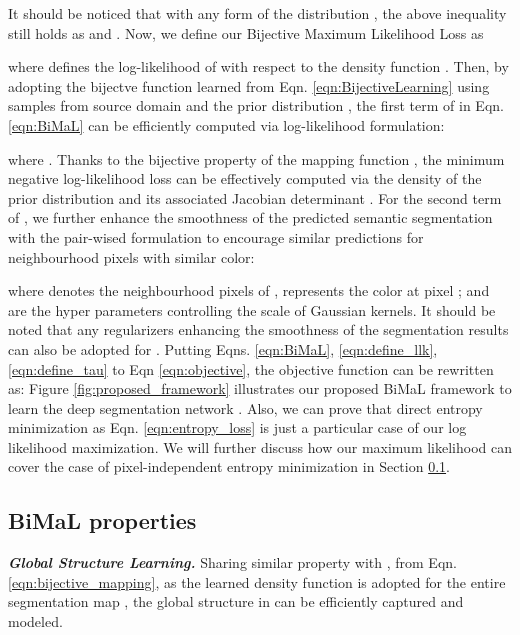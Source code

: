 \documentclass[10pt,twocolumn,letterpaper]{article}
\begin{document}
It should be noticed that with any form of the distribution , the above inequality still holds as  and . Now, we define our Bijective Maximum Likelihood Loss as

where  defines the log-likelihood of  with respect to the density function .
Then, by adopting the bijectve function  learned from Eqn. \eqref{eqn:BijectiveLearning} using samples from source domain and the prior distribution , the first term of  in Eqn. \eqref{eqn:BiMaL} can be efficiently computed via log-likelihood formulation:

where . Thanks to the bijective property of the mapping function , the minimum negative log-likelihood loss 
can be effectively computed via 
the density of the prior distribution  and its associated Jacobian determinant . For the second term of , we further enhance the smoothness of the predicted semantic segmentation with the pair-wised formulation to encourage similar predictions for neighbourhood pixels with similar color:

where  denotes the neighbourhood pixels of ,  represents the color at pixel ; and  are the hyper parameters controlling the scale of Gaussian kernels. 
It should be noted that any regularizers \cite{chen2018deeplab, duong2029cvpr_automatic} enhancing the smoothness of the segmentation results can also be adopted for .   
Putting Eqns. \eqref{eqn:BiMaL}, \eqref{eqn:define_llk}, \eqref{eqn:define_tau} to Eqn \eqref{eqn:objective}, the objective function can be rewritten as: 
Figure \ref{fig:proposed_framework} illustrates our proposed BiMaL framework to learn the deep segmentation network . Also, we can prove that direct entropy minimization as Eqn. \eqref{eqn:entropy_loss} is just a particular case of our log likelihood maximization. We will further discuss how our maximum likelihood can cover the case of pixel-independent entropy minimization in Section \ref{sec:MLE_Entropy}.
















\noindent
\subsection{BiMaL properties}  \label{sec:MLE_Entropy}


\textit{\textbf{Global Structure Learning.}} Sharing similar property with \cite{duong2016dam_cvpr, duong2019dam_ijcv, duong2020vec2face, Duong_2017_ICCV, 9108692}, from Eqn. \eqref{eqn:bijective_mapping}, as the learned density function is adopted for the entire segmentation map , the global structure in  can be efficiently captured and modeled.
\end{document}
